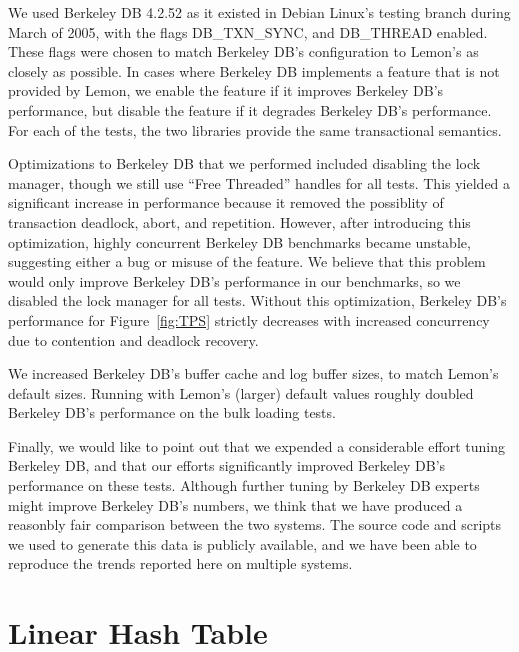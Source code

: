 \documentclass[letterpaper,twocolumn,english]{article}
\newcommand{\yad}{Lemon\xspace}
\newcommand{\oasys}{Juicer\xspace}
\begin{document}
We used Berkeley DB 4.2.52 as it existed in Debian Linux's testing
branch during March of 2005, with the flags DB\_TXN\_SYNC, and DB\_THREAD
enabled. These flags were chosen to match 
Berkeley DB's configuration to \yad's as closely as possible.  In cases where
Berkeley DB implements a feature that is not provided by \yad, we
enable the feature if it improves Berkeley DB's performance, but
disable the feature if it degrades Berkeley DB's performance.
For each of the tests, the two libraries provide the same transactional semantics.

Optimizations to Berkeley DB that we performed included disabling the
lock manager, though we still use ``Free Threaded'' handles for all
tests.  This yielded a significant increase in performance because it
removed the possiblity of transaction deadlock, abort, and repetition.
However, after introducing this optimization, highly concurrent
Berkeley DB benchmarks became unstable, suggesting either a bug or
misuse of the feature.  We believe that this problem would only
improve Berkeley DB's performance in our benchmarks, so we disabled
the lock manager for all tests.  Without this optimization, Berkeley
DB's performance for Figure~\ref{fig:TPS} strictly decreases with increased concurrency due to contention and deadlock recovery.

We increased Berkeley DB's buffer cache and log buffer sizes, to match
\yad's default sizes.  Running with \yad's (larger) default values
roughly doubled Berkeley DB's performance on the bulk loading tests.

Finally, we would like to point out that we expended a considerable
effort tuning Berkeley DB, and that our efforts significantly
improved Berkeley DB's performance on these tests.  Although further
tuning by Berkeley DB experts might improve Berkeley DB's
numbers, we think that we have produced a reasonbly fair comparison
between the two systems.  The source code and scripts we used to
generate this data is publicly available, and we have been able to
reproduce the trends reported here on multiple systems.


\section{Linear Hash Table\label{sub:Linear-Hash-Table}}
\end{document}
